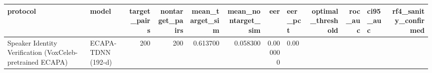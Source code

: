 \begin{tabular}{llrrrrrlrrlr}
\toprule
protocol & model & target_pairs & nontarget_pairs & mean_target_sim & mean_nontarget_sim & eer & eer_pct & optimal_threshold & roc_auc & ci95_auc & rf4_sanity_confirmed \\
\midrule
Speaker Identity Verification (VoxCeleb-pretrained ECAPA) & ECAPA-TDNN (192-d) & 200 & 200 & 0.613700 & 0.058300 & 0.000000 & 0.00%
\bottomrule
\end{tabular}
